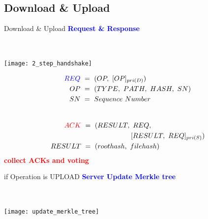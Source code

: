 \subsection{Download \& Upload}
\begin{frame}{Download \& Upload}
	\centering
	\textcolor{blue}{\textbf{Request \& Response}}\\
	~\\
	~\\
	\begin{minipage}{.45\textwidth}
        \texttt{[image: 2\_step\_handshake]}
    \end{minipage}%
	\begin{minipage}{.55\textwidth}
    	\footnotesize
		\centering
		\begin{equation*} \label{eq1}
                \begin{split}
                        \textcolor{blue}{REQ}\ & =\ (OP,\ [OP]_{pri(D)}) \\
                        OP\ & =\ (TYPE,\ PATH,\ HASH,\ SN) \\
                        SN\ & =\ Sequence\ Number
                \end{split}
        \end{equation*}
        \divider{}\\
        \begin{equation*} \label{eq2}
                \begin{split}
                        \textcolor{red}{ACK}\ & =\ (RESULT,\ REQ,\\
                        & \tab{}\tab{}[RESULT,\ REQ]_{pri(S)}) \\
                        RESULT\ & =\ (roothash,\ filehash)
                \end{split}
        \end{equation*}
        \textcolor{red}{\textbf{collect ACKs and voting}}
    \end{minipage}%
\end{frame}

\begin{frame}{if Operation is UPLOAD}
	\centering
	\textcolor{blue}{\textbf{Server Update Merkle tree}}\\
	~\\
	~\\
	\begin{center}
		\texttt{[image: update\_merkle\_tree]}
	\end{center}
\end{frame}

